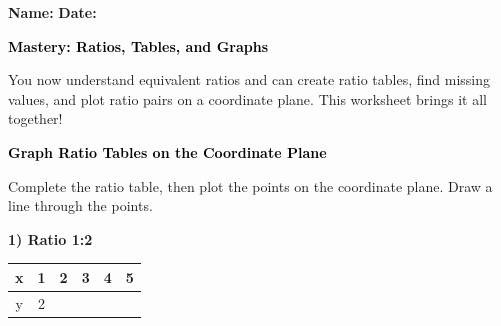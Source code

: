 \documentclass[12pt, letterpaper, fleqn]{article}
\begin{document}
\textbf{Name:} \underline{\hspace{5cm}}
\hfill
\textbf{Date:} \underline{\hspace{3cm}}\\

\begin{tcolorbox}[colback=customteal!20]
    \large\textcolor{black}{\textbf{Mastery: Ratios, Tables, and Graphs}}
\end{tcolorbox}

\vspace{3mm}

\noindent
You now understand equivalent ratios and can create ratio tables, find missing values, and plot ratio pairs on a coordinate plane. This worksheet brings it all together!

\vspace{4mm}

\begin{tcolorbox}[colback=customteal!20]
\large\textcolor{black}{\textbf{Graph Ratio Tables on the Coordinate Plane}}
\end{tcolorbox}

\noindent
Complete the ratio table, then plot the points on the coordinate plane. Draw a line through the points.

\vspace{3mm}

\noindent
\textbf{1) Ratio 1:2}

\begin{center}
\begin{tabular}{|c|c|c|c|c|c|}
\hline
x & 1 & 2 & 3 & 4 & 5 \\
\hline
y & 2 & \phantom{00} & \phantom{00} & \phantom{00} & \phantom{00} \\
\hline
\end{tabular}
\end{center}

\begin{center}
\end{center}
\end{document}
